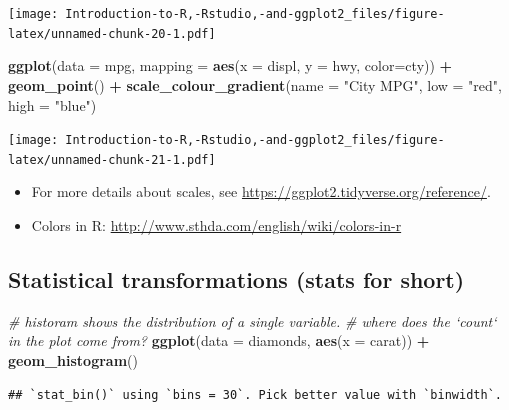 \documentclass[]{book}
\newenvironment{Shaded}{\begin{snugshade}}{\end{snugshade}}
\newcommand{\CommentTok}[1]{\textcolor[rgb]{0.56,0.35,0.01}{\textit{#1}}}
\newcommand{\DataTypeTok}[1]{\textcolor[rgb]{0.13,0.29,0.53}{#1}}
\newcommand{\KeywordTok}[1]{\textcolor[rgb]{0.13,0.29,0.53}{\textbf{#1}}}
\newcommand{\NormalTok}[1]{#1}
\newcommand{\OperatorTok}[1]{\textcolor[rgb]{0.81,0.36,0.00}{\textbf{#1}}}
\newcommand{\StringTok}[1]{\textcolor[rgb]{0.31,0.60,0.02}{#1}}
\begin{document}
\texttt{[image: Introduction-to-R,-Rstudio,-and-ggplot2\_files/figure-latex/unnamed-chunk-20-1.pdf]}

\begin{Shaded}
\begin{Highlighting}[]
\KeywordTok{ggplot}\NormalTok{(}\DataTypeTok{data =}\NormalTok{ mpg, }\DataTypeTok{mapping =} \KeywordTok{aes}\NormalTok{(}\DataTypeTok{x =}\NormalTok{ displ, }\DataTypeTok{y =}\NormalTok{ hwy, }\DataTypeTok{color=}\NormalTok{cty)) }\OperatorTok{+}\StringTok{ }\KeywordTok{geom_point}\NormalTok{() }\OperatorTok{+}\StringTok{ }\KeywordTok{scale_colour_gradient}\NormalTok{(}\DataTypeTok{name =} \StringTok{"City MPG"}\NormalTok{, }\DataTypeTok{low =} \StringTok{"red"}\NormalTok{, }\DataTypeTok{high =} \StringTok{"blue"}\NormalTok{)}
\end{Highlighting}
\end{Shaded}

\texttt{[image: Introduction-to-R,-Rstudio,-and-ggplot2\_files/figure-latex/unnamed-chunk-21-1.pdf]}

\begin{itemize}
\item
  For more details about scales, see \url{https://ggplot2.tidyverse.org/reference/}.
\item
  Colors in R: \url{http://www.sthda.com/english/wiki/colors-in-r}
\end{itemize}

\hypertarget{statistical-transformations-stats-for-short}{%
\subsection{\texorpdfstring{Statistical transformations (\textbf{stats} for short)}{Statistical transformations (stats for short)}}\label{statistical-transformations-stats-for-short}}

\begin{Shaded}
\begin{Highlighting}[]
\CommentTok{# historam shows the distribution of a single variable. }
\CommentTok{# where does the `count` in the plot come from? }
\KeywordTok{ggplot}\NormalTok{(}\DataTypeTok{data =}\NormalTok{ diamonds, }\KeywordTok{aes}\NormalTok{(}\DataTypeTok{x =}\NormalTok{ carat)) }\OperatorTok{+}\StringTok{ }\KeywordTok{geom_histogram}\NormalTok{()}
\end{Highlighting}
\end{Shaded}

\begin{verbatim}
## `stat_bin()` using `bins = 30`. Pick better value with `binwidth`.
\end{verbatim}
\end{document}
